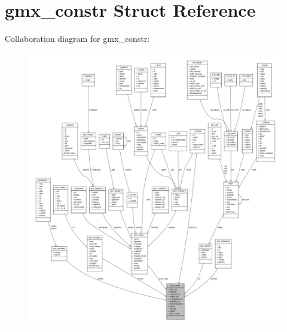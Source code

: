 \hypertarget{structgmx__constr}{\section{gmx\-\_\-constr \-Struct \-Reference}
\label{structgmx__constr}
}


\-Collaboration diagram for gmx\-\_\-constr\-:
\nopagebreak
\begin{figure}[H]
\begin{center}
\leavevmode
\includegraphics[width=350pt]{structgmx__constr__coll__graph}
\end{center}
\end{figure}
